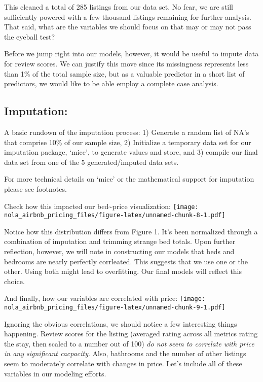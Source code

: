 \documentclass[]{article}
\begin{document}
This cleaned a total of 285 listings from our data set. No fear, we are
still sufficiently powered with a few thousand listings remaining for
further analysis. That said, what are the variables we should focus on
that may or may not pass the eyeball test?

Before we jump right into our models, however, it would be useful to
impute data for review scores. We can justify this move since its
missingness represents less than 1\% of the total sample size, but as a
valuable predictor in a short list of predictors, we would like to be
able employ a complete case analysis.

\hypertarget{imputation}{%
\subsection{Imputation:}\label{imputation}}

A basic rundown of the imputation process: 1) Generate a random list of
NA's that comprise 10\% of our sample size, 2) Initialize a temporary
data set for our imputation package, `mice', to generate values and
store, and 3) compile our final data set from one of the 5
generated/imputed data sets.

For more technical details on `mice' or the mathematical support for
imputation please see footnotes.

Check how this impacted our bed\textasciitilde{}price visualization:
\texttt{[image: nola\_airbnb\_pricing\_files/figure-latex/unnamed-chunk-8-1.pdf]}

Notice how this distribution differs from Figure 1. It's been normalized
through a combination of imputation and trimming strange bed totals.
Upon further reflection, however, we will note in constructing our
models that beds and bedrooms are nearly perfectly corrleated. This
suggests that we use one or the other. Using both might lead to
overfitting. Our final models will reflect this choice.

And finally, how our variables are correlated with price:
\texttt{[image: nola\_airbnb\_pricing\_files/figure-latex/unnamed-chunk-9-1.pdf]}

Ignoring the obvious correlations, we should notice a few interesting
things happening. Review scores for the listing (averaged rating across
all metrics rating the stay, then scaled to a number out of 100)
\emph{do not seem to correlate with price in any significant cacpacity}.
Also, bathrooms and the number of other listings seem to moderately
correlate with changes in price. Let's include all of these variables in
our modeling efforts.
\end{document}
